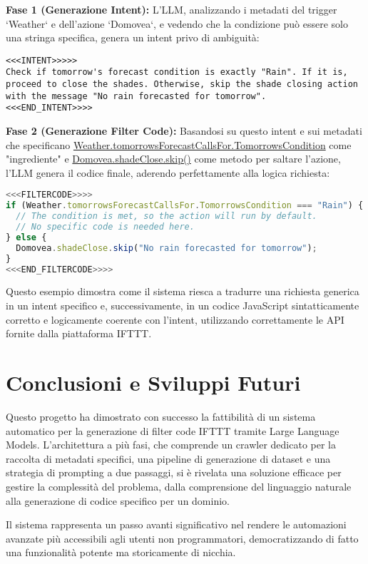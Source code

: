 \documentclass[sigconf,natbib=false]{acmart}
\begin{document}
\noindent\textbf{Fase 1 (Generazione Intent):} L'LLM, analizzando i metadati del trigger `Weather` e dell'azione `Domovea`, e vedendo che la condizione può essere solo una stringa specifica, genera un intent privo di ambiguità:
\begin{lstlisting}[language=text]
<<<INTENT>>>>>
Check if tomorrow's forecast condition is exactly "Rain". If it is, proceed to close the shades. Otherwise, skip the shade closing action with the message "No rain forecasted for tomorrow".
<<<END_INTENT>>>>
\end{lstlisting}

\noindent\textbf{Fase 2 (Generazione Filter Code):} Basandosi su questo intent e sui metadati che specificano \url{Weather.tomorrowsForecastCallsFor.TomorrowsCondition} come "ingrediente" e \url{Domovea.shadeClose.skip()} come metodo per saltare l'azione, l'LLM genera il codice finale, aderendo perfettamente alla logica richiesta:
\begin{lstlisting}[language=javascript]
<<<FILTERCODE>>>>
if (Weather.tomorrowsForecastCallsFor.TomorrowsCondition === "Rain") { 
  // The condition is met, so the action will run by default.
  // No specific code is needed here.
} else {  
  Domovea.shadeClose.skip("No rain forecasted for tomorrow");
}
<<<END_FILTERCODE>>>>
\end{lstlisting}
Questo esempio dimostra come il sistema riesca a tradurre una richiesta generica in un intent specifico e, successivamente, in un codice JavaScript sintatticamente corretto e logicamente coerente con l'intent, utilizzando correttamente le API fornite dalla piattaforma IFTTT.

\section{Conclusioni e Sviluppi Futuri}
Questo progetto ha dimostrato con successo la fattibilità di un sistema automatico per la generazione di filter code IFTTT tramite Large Language Models. L'architettura a più fasi, che comprende un crawler dedicato per la raccolta di metadati specifici, una pipeline di generazione di dataset e una strategia di prompting a due passaggi, si è rivelata una soluzione efficace per gestire la complessità del problema, dalla comprensione del linguaggio naturale alla generazione di codice specifico per un dominio.

Il sistema rappresenta un passo avanti significativo nel rendere le automazioni avanzate più accessibili agli utenti non programmatori, democratizzando di fatto una funzionalità potente ma storicamente di nicchia.
\end{document}
